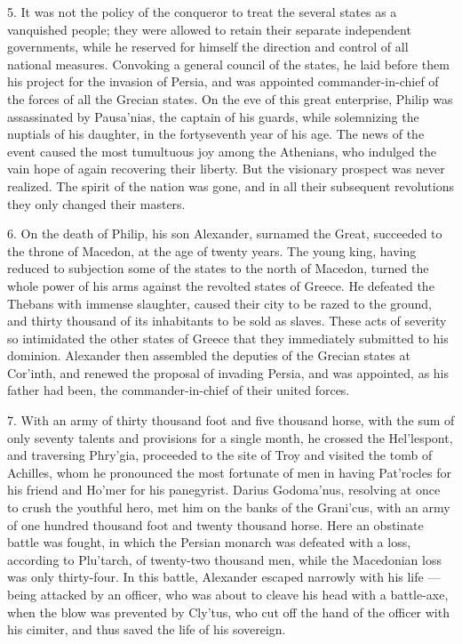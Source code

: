 \documentclass[openany,a4paper]{memoir}
\begin{document}
5. It was not the policy of the conqueror to treat the 
several states as a vanquished people; they were allowed to 
retain their separate independent governments, while he reserved for himself the direction and control of all national 
measures. Convoking a general council of the states, he 
laid before them his project for the invasion of Persia, and 
was appointed commander-in-chief of the forces of all the 
Grecian states. On the eve of this great enterprise, Philip 
was assassinated by Pausa'nias, the captain of his guards, 
while solemnizing the nuptials of his daughter, in the fortyseventh year of his age. The news of the event caused the 
most tumultuous joy among the Athenians, who indulged the 
vain hope of again recovering their liberty. But the visionary prospect was never realized. The spirit of the nation 
was gone, and in all their subsequent revolutions they only 
changed their masters. 

6. On the death of Philip, his son Alexander, surnamed 
the Great, succeeded to the throne of Macedon, at the age of 
twenty years. The young king, having reduced to subjection 
some of the states to the north of Macedon, turned the whole 
power of his arms against the revolted states of Greece. He 
defeated the Thebans with immense slaughter, caused their 
city to be razed to the ground, and thirty thousand of its inhabitants to be sold as slaves. These acts of severity so intimidated the other states of Greece that they immediately 
submitted to his dominion. Alexander then assembled the 
deputies of the Grecian states at Cor'inth, and renewed the 
proposal of invading Persia, and was appointed, as his father 
had been, the commander-in-chief of their united forces. 

7. With an army of thirty thousand foot and five thousand 
horse, with the sum of only seventy talents and provisions 
for a single month, he crossed the Hel'lespont, and traversing 
Phry'gia, proceeded to the site of Troy and visited the tomb 
of Achilles, whom he pronounced the most fortunate of men 
in having Pat'rocles for his friend and Ho'mer for his panegyrist. Darius Godoma'nus, resolving at once to crush the 
youthful hero, met him on the banks of the Grani'cus, with 
an army of one hundred thousand foot and twenty thousand 
horse. Here an obstinate battle was fought, in which the 
Persian monarch was defeated with a loss, according to Plu'tarch, of twenty-two thousand men, while the Macedonian 
loss was only thirty-four. In this battle, Alexander escaped 
narrowly with his life — being attacked by an officer, who was 
about to cleave his head with a battle-axe, when the blow 
was prevented by Cly'tus, who cut off the hand of the officer 
with his cimiter, and thus saved the life of his sovereign. 
\end{document}
